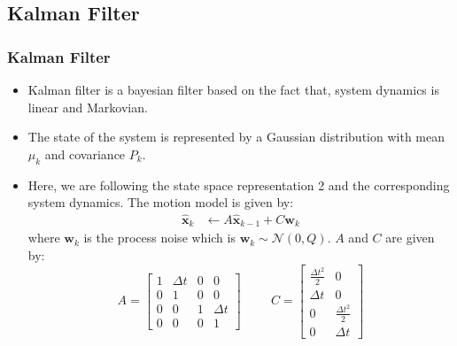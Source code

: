 \documentclass{beamer}
\begin{document}
\subsection{Kalman Filter}
\begin{frame}
\frametitle{Kalman Filter}
\begin{itemize}
    \item Kalman filter is a bayesian filter based on the fact that, system dynamics is linear and Markovian.
    \item The state of the system is represented by a Gaussian distribution with mean $\mu_k$ and covariance $P_k$.
    \item Here, we are following the state space representation 2 and the corresponding system dynamics. The motion model is given by:
    \begin{align*}
        \hat{\mathbf{x}}_k &\leftarrow A \hat{\mathbf{x}}_{k-1} + C \mathbf{w}_k
    \end{align*}
    where $\mathbf{w}_k$ is the process noise which is $\mathbf{w}_k \sim \mathcal{N}(0, Q)$. $A$ and $C$ are given by:
    \begin{equation*}
        A = \begin{bmatrix}
            1 & \Delta t & 0 & 0 \\
            0 & 1 & 0 & 0 \\
            0 & 0 & 1 & \Delta t \\
            0 & 0 & 0 & 1
        \end{bmatrix} \hspace{1cm} 
        C = \begin{bmatrix}
            \frac{\Delta t^2}{2} & 0 \\
            \Delta t & 0 \\
            0 & \frac{\Delta t^2}{2} \\
            0 & \Delta t
        \end{bmatrix}
    \end{equation*}
\end{itemize}
\end{frame}
\end{document}
